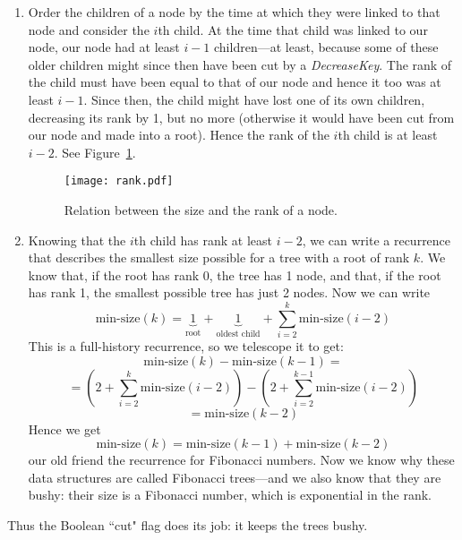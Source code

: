 \documentclass[11pt]{article}
\begin{document}
\begin{enumerate}
  \item 
    Order the children of a node by the time at which they were linked
    to that node and consider the $i$th child.  At the time that child
    was linked to our node, our node had at least $i-1$ children---at
    least, because some of these older children might since then have been
    cut by a \emph{DecreaseKey}.  The rank of the child must have been
    equal to that of our node and hence it too was at least $i-1$.
    Since then, the child might have lost one of its own children, decreasing
    its rank by 1, but no more (otherwise it would have been cut from our
    node and made into a root).  Hence the rank of the $i$th child is
    at least $i-2$.  See Figure~\ref{rank}.
    \begin{figure}[b]%
      \centering
      \texttt{[image: rank.pdf]}%
      \caption{Relation between the size and the rank of a node.}%
      \label{rank}%
    \end{figure}%
  \item
    Knowing that the $i$th child has rank at least $i-2$, we can write
    a recurrence that describes the smallest size possible for a tree
    with a root of rank $k$.  We know that, if the root has rank 0,
    the tree has 1 node, and that, if the root has rank 1, the smallest
    possible tree has just 2 nodes.  Now we can write
    $$\text{min-size}(k) = \underbrace{1}_{\text{root}} + \underbrace{1}_{\text{
oldest child}} + \sum_{i=2}^{k} \text{min-size}(i-2)$$
    This is a full-history recurrence, so we telescope it to get:
    $$\text{min-size}(k) - \text{min-size}(k-1) = {}$$  
    $$ {}  = \left( 2 + \sum_{i=2}^{k} \text{min-size}(i-2) \right) - \left( 2 +
 \sum_{i=2}^{k-1} \text{min-size}(i-2) \right)$$ 
    $$ {}  = \text{min-size}(k-2)$$
    Hence we get
      $$\text{min-size}(k) = \text{min-size}(k-1) + \text{min-size}(k-2)$$
    our old friend the recurrence for Fibonacci numbers.  Now we know why
    these data structures are called Fibonacci trees---and we also know
    that they are bushy: their size is a Fibonacci number, which is exponential
    in the rank.  
\end{enumerate}
Thus the Boolean ``cut" flag does its job: it keeps the trees bushy.
\end{document}
